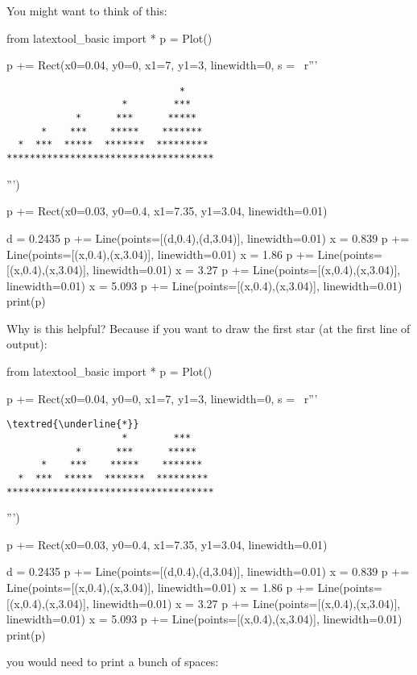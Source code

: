 You might want to think of this:

\begin{python}
from latextool_basic import *
p = Plot()

p += Rect(x0=0.04, y0=0, x1=7, y1=3, linewidth=0, s = \
r'''\begin{Verbatim}
                              *     
                    *        ***    
            *      ***      *****   
      *    ***    *****    *******  
  *  ***  *****  *******  ********* 
************************************
\end{Verbatim}''')

p += Rect(x0=0.03, y0=0.4, x1=7.35, y1=3.04, linewidth=0.01)

d = 0.2435
p += Line(points=[(d,0.4),(d,3.04)], linewidth=0.01)
x = 0.839
p += Line(points=[(x,0.4),(x,3.04)], linewidth=0.01)
x = 1.86
p += Line(points=[(x,0.4),(x,3.04)], linewidth=0.01)
x = 3.27
p += Line(points=[(x,0.4),(x,3.04)], linewidth=0.01)
x = 5.093
p += Line(points=[(x,0.4),(x,3.04)], linewidth=0.01)
print(p)
\end{python}


Why is this helpful?
Because if you want to draw the first star (at the first line of output):
\begin{python}
from latextool_basic import *
p = Plot()

p += Rect(x0=0.04, y0=0, x1=7, y1=3, linewidth=0, s = \
r'''\begin{Verbatim}[commandchars=\\\{\}]
                              \textred{\underline{*}}     
                    *        ***    
            *      ***      *****   
      *    ***    *****    *******  
  *  ***  *****  *******  ********* 
************************************
\end{Verbatim}''')

p += Rect(x0=0.03, y0=0.4, x1=7.35, y1=3.04, linewidth=0.01)

d = 0.2435
p += Line(points=[(d,0.4),(d,3.04)], linewidth=0.01)
x = 0.839
p += Line(points=[(x,0.4),(x,3.04)], linewidth=0.01)
x = 1.86
p += Line(points=[(x,0.4),(x,3.04)], linewidth=0.01)
x = 3.27
p += Line(points=[(x,0.4),(x,3.04)], linewidth=0.01)
x = 5.093
p += Line(points=[(x,0.4),(x,3.04)], linewidth=0.01)
print(p)
\end{python}

you would need to print a bunch of spaces:

